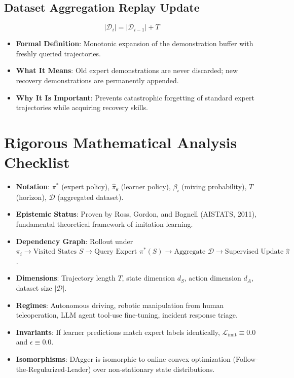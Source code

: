 \documentclass[11pt,a4paper]{article}
\theoremstyle{definition}
\begin{document}
\subsection{Dataset Aggregation Replay Update}
{\boldmath
\begin{equation}
|\mathcal{D}_i| = |\mathcal{D}_{i-1}| + T
\end{equation}
}
\begin{itemize}
    \item \textbf{Formal Definition}: Monotonic expansion of the demonstration buffer with freshly queried trajectories.
    \item \textbf{What It Means}: Old expert demonstrations are never discarded; new recovery demonstrations are permanently appended.
    \item \textbf{Why It Is Important}: Prevents catastrophic forgetting of standard expert trajectories while acquiring recovery skills.
\end{itemize}

\section{Rigorous Mathematical Analysis Checklist}

\begin{itemize}
    \item \textbf{Notation}: $\pi^*$ (expert policy), $\hat{\pi}_\theta$ (learner policy), $\beta_i$ (mixing probability), $T$ (horizon), $\mathcal{D}$ (aggregated dataset).
    \item \textbf{Epistemic Status}: Proven by Ross, Gordon, and Bagnell (AISTATS, 2011), fundamental theoretical framework of imitation learning.
    \item \textbf{Dependency Graph}: Rollout under $\pi_i \to \text{Visited States } S \to \text{Query Expert } \pi^*(S) \to \text{Aggregate } \mathcal{D} \to \text{Supervised Update } \hat{\pi}$.
    \item \textbf{Dimensions}: Trajectory length $T$, state dimension $d_S$, action dimension $d_A$, dataset size $|\mathcal{D}|$.
    \item \textbf{Regimes}: Autonomous driving, robotic manipulation from human teleoperation, LLM agent tool-use fine-tuning, incident response triage.
    \item \textbf{Invariants}: If learner predictions match expert labels identically, $\mathcal{L}_{\text{imit}} \equiv 0.0$ and $\epsilon \equiv 0.0$.
    \item \textbf{Isomorphisms}: DAgger is isomorphic to online convex optimization (Follow-the-Regularized-Leader) over non-stationary state distributions.
\end{itemize}
\end{document}
